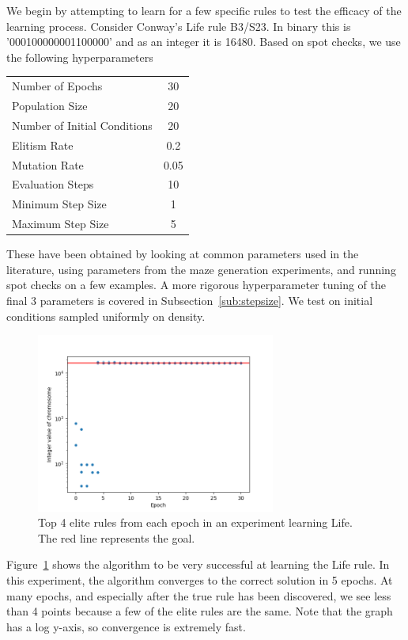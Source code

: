 We begin by attempting to learn for a few specific rules to test the efficacy of the learning process. Consider Conway's Life rule B3/S23. In binary this is '000100000001100000' and as an integer it is 16480. Based on spot checks, we use the following hyperparameters 
\begin{center}
    \begin{tabular}{ l c }
        Number of Epochs & 30\\
        Population Size & 20\\
        Number of Initial Conditions & 20\\
        Elitism Rate & 0.2\\
        Mutation Rate & 0.05\\
        Evaluation Steps & 10\\
        Minimum Step Size & 1\\
        Maximum Step Size & 5\\
    \end{tabular}
\end{center}
These have been obtained by looking at common parameters used in the literature, using parameters from the maze generation experiments, and running spot checks on a few examples. A more rigorous hyperparameter tuning of the final 3 parameters is covered in Subsection~\ref{sub:stepsize}. We test on initial conditions sampled uniformly on density. 

\begin{figure}[!h]
\centering
\includegraphics[width=0.7\textwidth]{images/life_like_eval/life-convgraph.png}
\caption{Top 4 elite rules from each epoch in an experiment learning Life. The red line represents the goal.}
\label{fig:life-convgraph}
\end{figure}

Figure~\ref{fig:life-convgraph} shows the algorithm to be very successful at learning the Life rule. In this experiment, the algorithm converges to the correct solution in 5 epochs. At many epochs, and especially after the true rule has been discovered, we see less than 4 points because a few of the elite rules are the same. Note that the graph has a log y-axis, so convergence is extremely fast.\\

